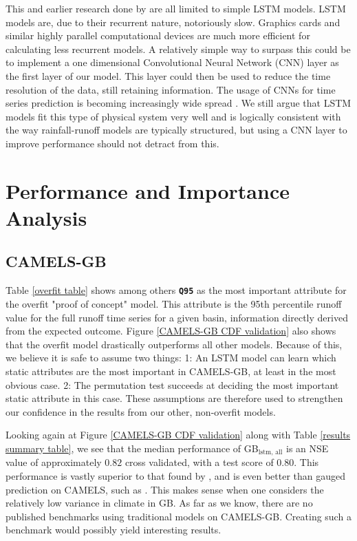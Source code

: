 This and earlier research done by \citet{lstm_first_paper,lstm_second_paper,lstm_third_paper} 
are all limited to simple LSTM models. LSTM models are, due to their recurrent nature, 
notoriously slow. Graphics cards and similar highly parallel computational devices 
are much more efficient for calculating less recurrent models. A relatively 
simple way to surpass this could be to implement a one dimensional 
Convolutional Neural Network (CNN) layer as the first layer of our model. This 
layer could then be used to reduce the time resolution of the data, still retaining 
information. The usage of CNNs for time series prediction is becoming increasingly
wide spread \citationneeded. We still argue that LSTM models fit this type of 
physical system very well and is logically consistent with the way rainfall-runoff 
models are typically structured, but using a CNN layer to improve performance 
should not detract from this.

\section{Performance and Importance Analysis}
\label{discuss static attributes}
\subsection{CAMELS-GB}
Table \ref{overfit table} shows among others \textbf{\texttt{Q95}} as the most 
important attribute for the overfit "proof of concept" model. This attribute is the 
95th percentile runoff value for the full runoff time series for a given basin, 
information directly derived from the expected outcome. 
Figure \ref{CAMELS-GB CDF validation} also shows that the overfit model drastically 
outperforms all other models.
Because of this, we believe it is 
safe to assume two things: 1: An LSTM model can learn which static attributes are 
the most important in CAMELS-GB, at least in the most obvious case. 2: The permutation test 
succeeds at deciding the most important static attribute in this case. These 
assumptions are therefore used to strengthen our confidence in the results from 
our other, non-overfit models. 

Looking again at Figure \ref{CAMELS-GB CDF validation} along with Table 
\ref{results summary table}, we see that the median performance of GB$_\text{lstm, all}$ 
is an NSE value of approximately $0.82$ cross validated, with a test score of $0.80$. 
This performance is vastly superior to that found by \citet{lstm_third_paper}, and 
is even better than gauged prediction on CAMELS, such as \citet{lstm_second_paper}. 
This makes sense when one considers the relatively low variance in climate in GB. 
As far as we know, there are no published benchmarks using traditional models on 
CAMELS-GB. Creating such a benchmark would possibly yield interesting results.

